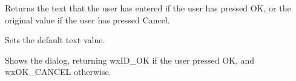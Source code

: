 Returns the text that the user has entered if the user has pressed OK, or the original value
if the user has pressed Cancel.

\label{wxtextentrydialogsetvalue}


Sets the default text value.

\label{wxtextentrydialogshowmodal}


Shows the dialog, returning wxID\_OK if the user pressed OK, and wxOK\_CANCEL
otherwise.


